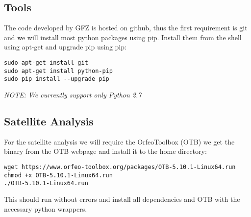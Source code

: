\documentclass{article}
\begin{document}
\subsection{Tools}
The code developed by GFZ is hosted on github, 
thus the first requirement is git and we will install 
most python packages using pip.
Install them from the shell using apt-get and upgrade pip 
using pip:

\begin{verbatim}
sudo apt-get install git
sudo apt-get install python-pip
sudo pip install --upgrade pip
\end{verbatim}

\textit{NOTE: We currently support only Python 2.7}

\subsection{Satellite Analysis}

For the satellite analysis we will require the OrfeoToolbox (OTB) 
we get the binary from the OTB webpage and install it to the home
directory:
\begin{verbatim}
wget https://www.orfeo-toolbox.org/packages/OTB-5.10.1-Linux64.run
chmod +x OTB-5.10.1-Linux64.run
./OTB-5.10.1-Linux64.run
\end{verbatim}

%
This should run without errors and install all dependencies and
OTB with the necessary python wrappers.
\end{document}
